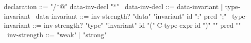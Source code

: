\begin{syntax}
  declaration ::= "/*@" data-inv-decl "*" 
  \
  data-inv-decl ::= data-invariant | type-invariant
  \
  data-invariant ::= inv-strength? "data" "invariant" id ":" pred ";"
  \
  type-invariant ::= inv-strength? "type" "invariant" id "(" C-type-expr id ")" "{" pred "}"
  \
  inv-strength ::= "weak" | "strong"
\end{syntax}